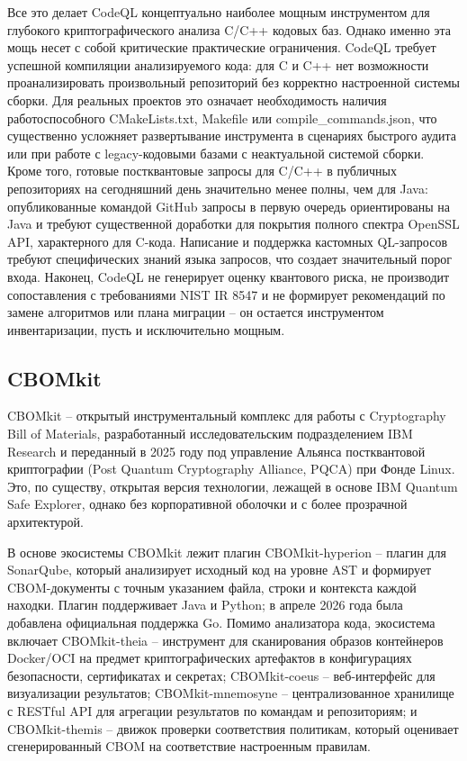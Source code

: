 \documentclass{itmo-vkr}
\begin{document}
	Все это делает CodeQL концептуально наиболее мощным инструментом для глубокого криптографического анализа C/C++ кодовых баз. Однако именно эта мощь несет с собой критические практические ограничения. CodeQL требует успешной компиляции анализируемого кода: для C и C++ нет возможности проанализировать произвольный репозиторий без корректно настроенной системы сборки. Для реальных проектов это означает необходимость наличия работоспособного CMakeLists.txt, Makefile или compile\_commands.json, что существенно усложняет развертывание инструмента в сценариях быстрого аудита или при работе с legacy-кодовыми базами с неактуальной системой сборки. Кроме того, готовые постквантовые запросы для C/C++ в публичных репозиториях на сегодняшний день значительно менее полны, чем для Java: опубликованные командой GitHub запросы в первую очередь ориентированы на Java и требуют существенной доработки для покрытия полного спектра OpenSSL API, характерного для C-кода. Написание и поддержка кастомных QL-запросов требуют специфических знаний языка запросов, что создает значительный порог входа. Наконец, CodeQL не генерирует оценку квантового риска, не производит сопоставления с требованиями NIST IR 8547 и не формирует рекомендаций по замене алгоритмов или плана миграции -- он остается инструментом инвентаризации, пусть и исключительно мощным.
	
	\subsection{CBOMkit}
	
	CBOMkit -- открытый инструментальный комплекс для работы с Cryptography Bill of Materials, разработанный исследовательским подразделением IBM Research и переданный в 2025 году под управление Альянса постквантовой криптографии (Post Quantum Cryptography Alliance, PQCA) при Фонде Linux. Это, по существу, открытая версия технологии, лежащей в основе IBM Quantum Safe Explorer, однако без корпоративной оболочки и с более прозрачной архитектурой.
	
	В основе экосистемы CBOMkit лежит плагин CBOMkit-hyperion -- плагин для SonarQube, который анализирует исходный код на уровне AST и формирует CBOM-документы с точным указанием файла, строки и контекста каждой находки. Плагин поддерживает Java и Python; в апреле 2026 года была добавлена официальная поддержка Go. Помимо анализатора кода, экосистема включает CBOMkit-theia -- инструмент для сканирования образов контейнеров Docker/OCI на предмет криптографических артефактов в конфигурациях безопасности, сертификатах и секретах; CBOMkit-coeus -- веб-интерфейс для визуализации результатов; CBOMkit-mnemosyne -- централизованное хранилище с RESTful API для агрегации результатов по командам и репозиториям; и CBOMkit-themis -- движок проверки соответствия политикам, который оценивает сгенерированный CBOM на соответствие настроенным правилам.
	
\end{document}
